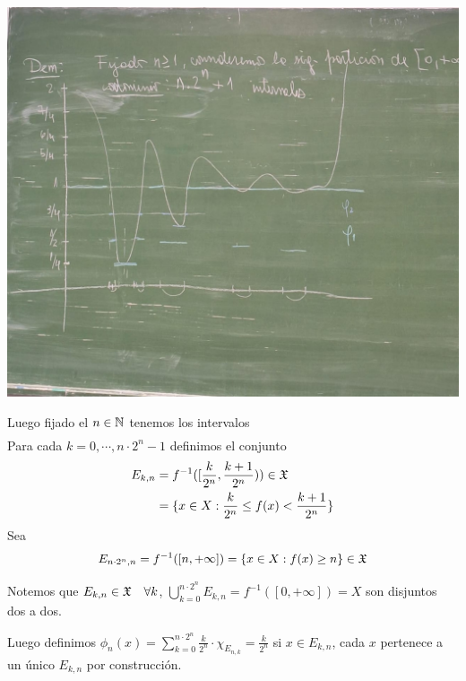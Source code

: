 \clearpage

\begin{center}
    \includegraphics[width=1\textwidth]{Images/clase4.jpeg}
\end{center}
Luego fijado el $n \in \mathbb{N}$ tenemos los intervalos \begin{align*}
    [0, \frac{1}{2}), [\frac{1}{2^n}, \frac{2}{2^n}), \cdots, [\frac{2^{n-1}}{2^n}, \frac{2^n}{2^n}),
    [\frac{2^n}{2^n}, \frac{2^n+1}{2^n}), \cdots, [\frac{n \cdot 2^n - 1}{2^n}, \frac{n \cdot 2^n}{2^n}), [n, +\infty]
\end{align*}
Para cada $k = 0, \cdots, n \cdot 2^n - 1$ definimos el conjunto
\begin{align*}
    E_{k, n} & = f^{-1}([\frac{k}{2^n}, \frac{k+1}{2^n})) \in \mathfrak{X}       \\
             & = \{ x \in X : \frac{k}{2^n} \leq f(x) < \frac{k+1}{2^n} \}
\end{align*}
Sea \begin{align*}
    E_{n \cdot 2^n, n} = f^{-1}([n, +\infty]) = \{ x \in X : f(x) \geq n \} \in \mathfrak{X}
\end{align*}

Notemos que $E_{k, n} \in \mathfrak{X} \quad \forall k$, $\bigcup_{k = 0}^{n \cdot 2^n} E_{k, n} = f^{-1}([0, +\infty]) = X$ son disjuntos dos a dos.

Luego definimos $\phi_n(x) = \sum_{k = 0}^{n \cdot 2^n} \frac{k}{2^n} \cdot \chi_{E_{n, k}} = \frac{k}{2^n}$ si $x \in E_{k, n}$, cada $x$ pertenece a un único $E_{k, n}$ por construcción.

